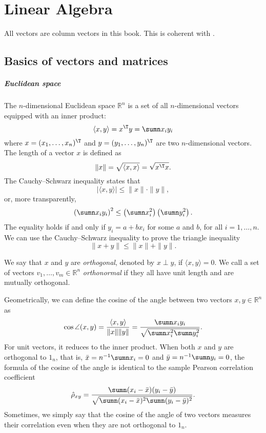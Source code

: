  
\chapter{Linear Algebra}\label{chapter::linear-algebra}
 

All vectors are column vectors in this book. This is coherent with . 


\section{Basics of vectors and matrices}
 \label{sec::basics-vectors-matrices}

\paragraph*{Euclidean space}

The $n$-dimensional Euclidean space $\mathbb{R}^{n}$ is a set of
all $n$-dimensional vectors equipped with an inner product: 
$$
\langle x,y \rangle =x^{\T}y=\sumn x_{i}y_{i}
$$
where $x=(x_{1},\ldots,x_{n})^{\T}$ and $y=(y_{1},\ldots,y_{n})^{\T}$
are two $n$-dimensional vectors. The length of a vector $x$
is defined as 
$$
\|x\|=\sqrt{\langle x,x\rangle }=\sqrt{x^{\T}x}.
$$ 
The Cauchy--Schwarz
inequality states that
\[
|\langle x,y \rangle |\leq\|x\|\cdot\|y\|,
\]
or, more transparently,
$$
\left(  \sumn x_i y_i  \right)^2  \leq  \left(  \sumn x_i^2  \right) \left(  \sumn y_i^2  \right)  . 
$$
The equality holds if and only if $y_i = a+bx_i$ for some $a$ and $b$, for all $i=1,\ldots, n.$ We can use the Cauchy--Schwarz inequality to prove the triangle inequality
$$
\| x + y \| \leq \| x\| + \| y\| .  
$$


We say that $x$ and $y$ are {\it orthogonal}, denoted by $x\perp y$, if $\langle x,y \rangle=0$. We call a set of vectors $v_1, \ldots, v_m \in \mathbb{R}^{n}$ {\it orthonormal} if they all have unit length and are mutually orthogonal. 




Geometrically, we can define the cosine of the angle between two vectors $x, y \in \mathbb{R}^n$ as
$$
\cos \angle (x, y) = \frac{ \langle x, y \rangle    }{   \| x \| \| y \|  }
= \frac{  \sumn x_i y_i  }{    \sqrt{  \sumn x_i^2 \sumn y_i^2  }  }.
$$
For unit vectors, it reduces to the inner product. 
When both $x$ and $y$ are orthogonal to $1_n$, that is, $\bar{x} = n^{-1} \sumn x_i =0$ and $\bar{y} = n^{-1} \sumn y_i =0$, the formula of the cosine of the angle is identical to the sample Pearson correlation coefficient
$$
\hat{\rho}_{xy} =  \frac{  \sumn (x_i - \bar{x})  (y_i - \bar{y} )  }{  \sqrt{   \sumn (x_i - \bar{x} ) ^2 \sumn (y_i - \bar{y})^2  }  } .
$$
Sometimes, we simply say that the cosine of the angle of two vectors measures their correlation even when they are not orthogonal to $1_n$. 


